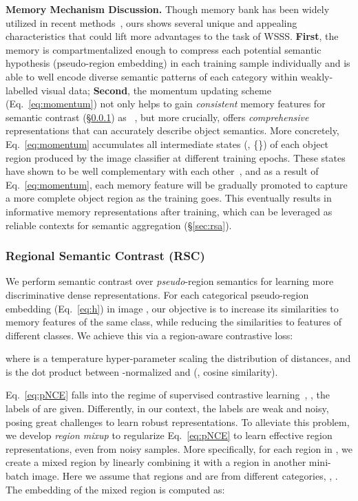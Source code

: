 \documentclass[10pt,twocolumn,letterpaper]{article}
\begin{document}
\noindent\textbf{Memory Mechanism Discussion.} 
Though memory bank has been widely utilized in recent methods~\cite{xiao2017joint,wu2018unsupervised,he2020momentum}, ours shows several unique and appealing characteristics that could lift more advantages to the task of \mbox{WSSS}. \textbf{First}, the memory is compartmentalized enough to compress each potential semantic hypothesis (\ie pseudo-region embedding) in each training sample individually and is able to well encode diverse semantic patterns of each category within weakly-labelled visual data; \textbf{Second}, the momentum updating scheme (Eq.~\ref{eq:momentum}) not only helps to gain \textit{consistent} memory features for semantic contrast (\S\ref{sec:rsc}) as ~\cite{wu2018unsupervised,he2020momentum}, but more crucially, offers \textit{comprehensive} representations that can accurately describe object semantics. More concretely, Eq.~\ref{eq:momentum} accumulates all intermediate states (\eg, \{\}) of each object region produced by the image classifier at different training epochs. These states have shown to be well complementary with each other~\cite{jiang2019integral}, and as a result of Eq.~\ref{eq:momentum}, each memory feature  will be gradually promoted to capture a more complete object region as the training goes. This eventually results in informative memory representations after training, which can be leveraged as reliable  contexts for  semantic aggregation (\S\ref{sec:rsa}). 


 


\subsubsection{Regional Semantic Contrast (RSC)} \label{sec:rsc}

We perform semantic contrast over \textit{pseudo}-region semantics for learning more discriminative dense representations. For each categorical pseudo-region embedding  (Eq.\!~\ref{eq:h}) in image , our objective is to increase its similarities to memory features   of the same class, while reducing the similarities to features   of different classes. We achieve this via a region-aware contrastive loss:
\vspace{-3pt}

where  is a temperature hyper-parameter scaling the distribution of distances, and  is the dot product between -normalized  and  (\ie, cosine similarity).

Eq.~\ref{eq:pNCE} falls into the regime of supervised contrastive learning~\cite{khosla2020supervised}, \ie, the labels of {} are given. Differently, in our context, the labels are weak and noisy, posing great challenges  to learn robust representations. 
To alleviate this problem, we develop \emph{region mixup} to regularize Eq.~\ref{eq:pNCE} to learn effective region representations, even from noisy samples. More specifically, for each region  in , we create a mixed region by linearly combining it with a region  in another mini-batch image. Here we assume that  regions  and  are from different categories, \ie, . The embedding of the mixed region  is computed as:
\vspace{-3pt}
\end{document}
